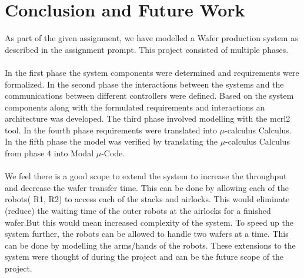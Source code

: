 \documentclass[a4paper,12pt]{article}
\begin{document}
	\section{Conclusion and Future Work}
	As part of the given assignment, we have modelled a Wafer production system as described in the assignment prompt. This project consisted of multiple phases. 
	\\
	\\In the first phase the system components were determined and requirements were formalized. In the second phase the interactions between the systems and the communications between different controllers were defined. Based on the system components along with the formulated requirements and interactions an architecture was developed. The third phase involved modelling with the mcrl2 tool. In the fourth phase requirements were translated into $\mu$-calculus Calculus. In the fifth phase the model was verified by translating the $\mu$-calculus Calculus from phase 4 into Modal $\mu$-Code. 
	\\
	\\We feel there is a good scope to extend the system to increase the throughput and decrease the wafer transfer time. This can be done by allowing each of the robots( R1, R2) to access each of the stacks and airlocks. This would eliminate (reduce) the waiting time of the outer robots at the airlocks for a finished wafer.But this would mean increased complexity of the system. To speed up the system further, the robots can be allowed to handle two wafers at a time. This can be done by modelling the arms/hands of the robots. These extensions to the system were thought of during the project and can be the future scope of the project. 
	\newpage
	\appendix
\end{document}
